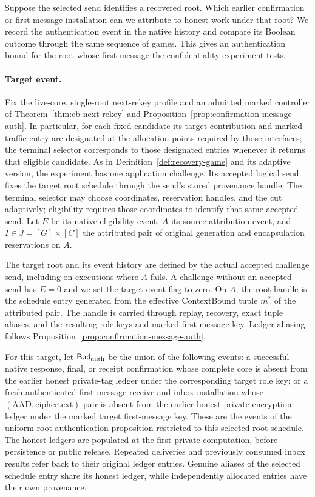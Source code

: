 \documentclass[pdflatex]{sn-jnl}
\theoremstyle{thmstyleone}
\theoremstyle{thmstylethree}
\theoremstyle{thmstyletwo}
\begin{document}
Suppose the selected send identifies a recovered root. Which earlier
confirmation or first-message installation can we attribute to honest
work under that root? We record the authentication event in the native
history and compare its Boolean outcome through the same sequence of
games. This gives an authentication bound for the root whose first
message the confidentiality experiment tests.

\paragraph{Target event.}
Fix the live-core, single-root next-rekey profile and an admitted marked
controller of Theorem~\ref{thm:cb-next-rekey} and
Proposition~\ref{prop:confirmation-message-auth}.  In particular, for each
fixed candidate its target contribution and marked traffic entry are
designated at the allocation points required by those interfaces; the
terminal selector corresponds to those designated entries whenever
it returns that eligible candidate.  As in
Definition~\ref{def:recovery-game} and its adaptive version, the experiment
has one application challenge.  Its accepted logical send fixes
the target root schedule through the send's stored provenance handle.  The
terminal selector may choose coordinates, reservation handles, and the cut
adaptively; eligibility requires those coordinates to identify that same
accepted send.  Let $E$ be its native eligibility event, $A$ its
source-attribution event, and $I\in J=[G]\times[C]$ the attributed pair of
original generation and encapsulation reservations on $A$.

The target root and its event history are defined by the actual accepted
challenge send, including on executions where $A$ fails.  A challenge without
an accepted send has $E=0$ and we set the target event flag to zero.  On $A$,
the root handle is the schedule entry generated from the effective
ContextBound tuple $m^*$ of the attributed pair.  The handle is carried
through replay, recovery, exact tuple aliases, and the resulting role keys
and marked first-message key.  Ledger aliasing follows
Proposition~\ref{prop:confirmation-message-auth}.

For this target, let $\mathsf{Bad}_{\rm auth}$ be the union of the following
events: a successful native response, final, or receipt confirmation whose
complete core is absent from the earlier honest private-tag ledger under the
corresponding target role key; or a fresh authenticated first-message receive
and inbox installation whose $(\mathrm{AAD},\mathrm{ciphertext})$ pair is absent
from the earlier honest private-encryption ledger under the marked target
first-message key.  These are the events of the uniform-root authentication
proposition restricted to this selected root schedule.  The honest ledgers
are populated at the first private computation, before persistence or public
release.  Repeated deliveries and previously consumed inbox results refer
back to their original ledger entries.  Genuine aliases of the selected
schedule entry share its honest ledger, while independently allocated
entries have their own provenance.
\end{document}
